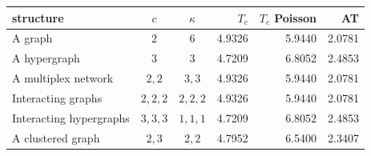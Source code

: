\begin{tabular}{lccrrr}
\hline\hline
structure & $c$ & $\kappa$ & $T_{c}$ & $T_{c}$ Poisson & AT\\
\hline
A graph & $2$ & $6$ & 4.9326 & 5.9440 & 2.0781\\
A hypergraph & $3$ & $3$ & 4.7209 & 6.8052 & 2.4853\\
A multiplex network & $2,2$ & $3,3$ & 4.9326 & 5.9440 & 2.0781\\
Interacting graphs & $2,2,2$ & $2,2,2$ & 4.9326 & 5.9440 & 2.0781\\
Interacting hypergraphs & $3,3,3$ & $1,1,1$ & 4.7209 & 6.8052 & 2.4853\\
A clustered graph & $2,3$ & $2,2$ & 4.7952 & 6.5400 & 2.3407\\
\hline\hline
\end{tabular}
